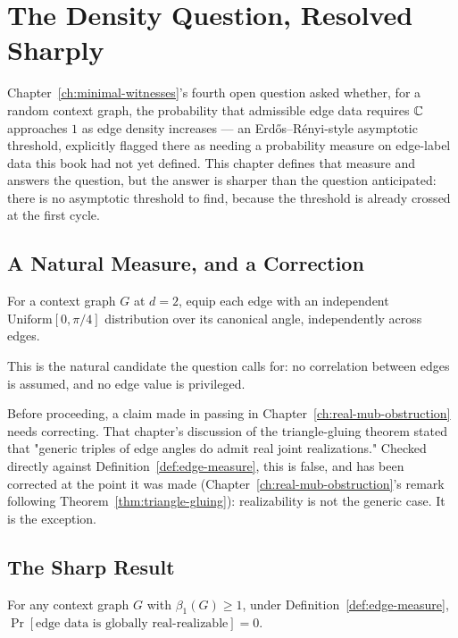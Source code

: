 \chapter{The Density Question, Resolved Sharply}
\label{ch:density}

Chapter~\ref{ch:minimal-witnesses}'s fourth open question asked whether,
for a random context graph, the probability that admissible edge data
requires $\mathbb{C}$ approaches $1$ as edge density increases — an
Erd\H{o}s--R\'enyi-style asymptotic threshold, explicitly flagged there as
needing a probability measure on edge-label data this book had not yet
defined. This chapter defines that measure and answers the question, but
the answer is sharper than the question anticipated: there is no
asymptotic threshold to find, because the threshold is already crossed at
the first cycle.

\section{A Natural Measure, and a Correction}

\begin{definition}
\label{def:edge-measure}
For a context graph $G$ at $d=2$, equip each edge with an independent
$\mathrm{Uniform}[0,\pi/4]$ distribution over its canonical angle,
independently across edges.
\end{definition}

This is the natural candidate the question calls for: no correlation
between edges is assumed, and no edge value is privileged.

Before proceeding, a claim made in passing in
Chapter~\ref{ch:real-mub-obstruction} needs correcting. That chapter's
discussion of the triangle-gluing theorem stated that "generic triples of
edge angles do admit real joint realizations." Checked directly against
Definition~\ref{def:edge-measure}, this is false, and has been corrected
at the point it was made (Chapter~\ref{ch:real-mub-obstruction}'s remark
following Theorem~\ref{thm:triangle-gluing}): realizability is not the
generic case. It is the exception.

\section{The Sharp Result}

\begin{theorem}
\label{thm:density-sharp}
For any context graph $G$ with $\beta_1(G)\ge1$, under
Definition~\ref{def:edge-measure}, $\Pr[\text{edge data is globally
real-realizable}] = 0$.
\end{theorem}


